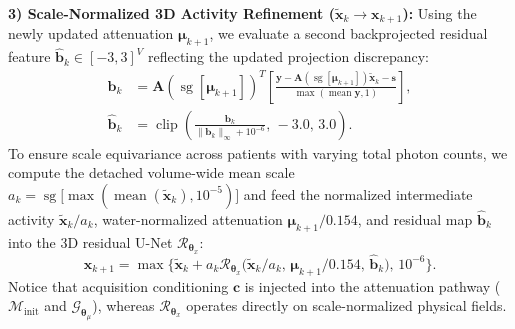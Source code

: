 \documentclass[11pt, a4paper]{article}
\begin{document}
\textbf{3) Scale-Normalized 3D Activity Refinement ($\widetilde{\mathbf{x}}_k \to \mathbf{x}_{k+1}$):} Using the newly updated attenuation $\boldsymbol{\mu}_{k+1}$, we evaluate a second backprojected residual feature $\widehat{\mathbf{b}}_k \in [-3, 3]^V$ reflecting the updated projection discrepancy:
\begin{align}
\mathbf{b}_k &= \mathbf{A}(\operatorname{sg}[\boldsymbol{\mu}_{k+1}])^T \left[ \frac{\mathbf{y} - \mathbf{A}(\operatorname{sg}[\boldsymbol{\mu}_{k+1}])\widetilde{\mathbf{x}}_k - \mathbf{s}}{\max(\operatorname{mean} \mathbf{y}, 1)} \right], \\
\widehat{\mathbf{b}}_k &= \operatorname{clip}\!\left( \frac{\mathbf{b}_k}{\|\mathbf{b}_k\|_\infty + 10^{-6}}, \, -3.0, \, 3.0 \right).
\end{align}
To ensure scale equivariance across patients with varying total photon counts, we compute the detached volume-wide mean scale $a_k = \operatorname{sg}\big[\max(\operatorname{mean}(\widetilde{\mathbf{x}}_k), 10^{-5})\big]$ and feed the normalized intermediate activity $\widetilde{\mathbf{x}}_k / a_k$, water-normalized attenuation $\boldsymbol{\mu}_{k+1} / 0.154$, and residual map $\widehat{\mathbf{b}}_k$ into the 3D residual U-Net $\mathcal{R}_{\boldsymbol{\theta}_x}$:
\begin{equation}
\mathbf{x}_{k+1} = \max\Big\{ \widetilde{\mathbf{x}}_k + a_k \mathcal{R}_{\boldsymbol{\theta}_x}\big( \widetilde{\mathbf{x}}_k / a_k, \, \boldsymbol{\mu}_{k+1} / 0.154, \, \widehat{\mathbf{b}}_k \big), \, 10^{-6} \Big\}.
\end{equation}
Notice that acquisition conditioning $\mathbf{c}$ is injected into the attenuation pathway ($\mathcal{M}_{\text{init}}$ and $\mathcal{G}_{\boldsymbol{\theta}_\mu}$), whereas $\mathcal{R}_{\boldsymbol{\theta}_x}$ operates directly on scale-normalized physical fields.
\end{document}

